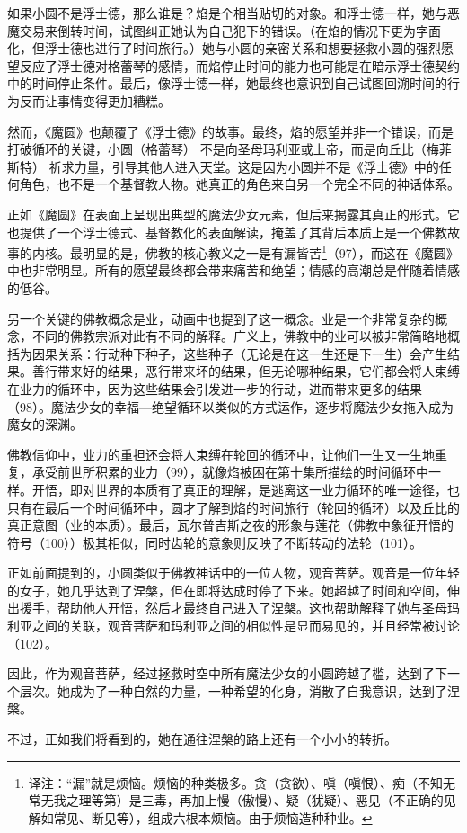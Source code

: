 如果小圆不是浮士德，那么谁是？焰是个相当贴切的对象。和浮士德一样，她与恶魔交易来倒转时间，试图纠正她认为自己犯下的错误。（在焰的情况下更为字面化，但浮士德也进行了时间旅行。）她与小圆的亲密关系和想要拯救小圆的强烈愿望反应了浮士德对格蕾琴的感情，而焰停止时间的能力也可能是在暗示浮士德契约中的时间停止条件。最后，像浮士德一样，她最终也意识到自己试图回溯时间的行为反而让事情变得更加糟糕。

然而，《魔圆》也颠覆了《浮士德》的故事。最终，焰的愿望并非一个错误，而是打破循环的关键，小圆（格蕾琴） 不是向圣母玛利亚或上帝，而是向丘比（梅菲斯特） 祈求力量，引导其他人进入天堂。这是因为小圆并不是《浮士德》中的任何角色，也不是一个基督教人物。她真正的角色来自另一个完全不同的神话体系。

正如《魔圆》在表面上呈现出典型的魔法少女元素，但后来揭露其真正的形式。它也提供了一个浮士德式、基督教化的表面解读，掩盖了其背后本质上是一个佛教故事的内核。最明显的是，佛教的核心教义之一是有漏皆苦\footnote{译注：“漏”就是烦恼。烦恼的种类极多。贪（贪欲）、嗔（嗔恨）、痴（不知无常无我之理等第）是三毒，再加上慢（傲慢）、疑（犹疑）、恶见（不正确的见解如常见、断见等），组成六根本烦恼。由于烦恼造种种业。}（97），而这在《魔圆》中也非常明显。所有的愿望最终都会带来痛苦和绝望；情感的高潮总是伴随着情感的低谷。

另一个关键的佛教概念是业，动画中也提到了这一概念。业是一个非常复杂的概念，不同的佛教宗派对此有不同的解释。广义上，佛教中的业可以被非常简略地概括为因果关系：行动种下种子，这些种子（无论是在这一生还是下一生）会产生结果。善行带来好的结果，恶行带来坏的结果，但无论哪种结果，它们都会将人束缚在业力的循环中，因为这些结果会引发进一步的行动，进而带来更多的结果（98）。魔法少女的幸福—绝望循环以类似的方式运作，逐步将魔法少女拖入成为魔女的深渊。

佛教信仰中，业力的重担还会将人束缚在轮回的循环中，让他们一生又一生地重复，承受前世所积累的业力（99），就像焰被困在第十集所描绘的时间循环中一样。开悟，即对世界的本质有了真正的理解，是逃离这一业力循环的唯一途径，也只有在最后一个时间循环中，圆才了解到焰的时间旅行（轮回的循环）以及丘比的真正意图（业的本质）。最后，瓦尔普吉斯之夜的形象与莲花（佛教中象征开悟的符号（100））极其相似，同时齿轮的意象则反映了不断转动的法轮（101）。

正如前面提到的，小圆类似于佛教神话中的一位人物，观音菩萨。观音是一位年轻的女子，她几乎达到了涅槃，但在即将达成时停了下来。她超越了时间和空间，伸出援手，帮助他人开悟，然后才最终自己进入了涅槃。这也帮助解释了她与圣母玛利亚之间的关联，观音菩萨和玛利亚之间的相似性是显而易见的，并且经常被讨论（102）。

因此，作为观音菩萨，经过拯救时空中所有魔法少女的小圆跨越了槛，达到了下一个层次。她成为了一种自然的力量，一种希望的化身，消散了自我意识，达到了涅槃。

不过，正如我们将看到的，她在通往涅槃的路上还有一个小小的转折。